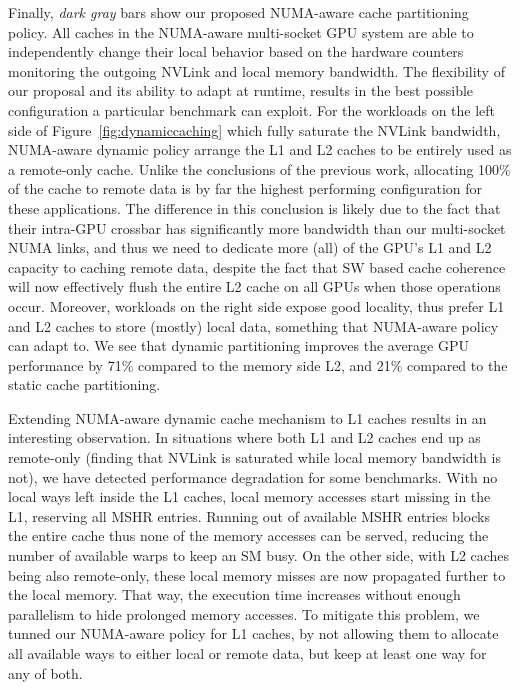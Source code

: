 Finally, \emph{dark gray} bars show our proposed NUMA-aware cache 
partitioning policy. All caches in the NUMA-aware multi-socket GPU system are 
able to independently change their local behavior based on the hardware 
counters monitoring the outgoing NVLink and local memory bandwidth. The 
flexibility of our proposal and its ability to adapt at runtime, results in 
the best possible configuration a particular benchmark can exploit. For the 
workloads on the left side of Figure~\ref{fig:dynamiccaching} which fully 
saturate the NVLink bandwidth, NUMA-aware dynamic policy arrange the L1 and 
L2 caches to be entirely used as a remote-only cache. Unlike the conclusions 
of the previous work, allocating 100\% of the cache to remote data is by far 
the highest performing configuration for these applications. The difference 
in this conclusion is likely due to the fact that their intra-GPU crossbar 
has significantly more bandwidth than our multi-socket NUMA links, and thus 
we need to dedicate more (all) of the GPU's L1 and L2 capacity to caching 
remote data, despite the fact that SW based cache coherence will now 
effectively flush the entire L2 cache on all GPUs when those operations 
occur. Moreover, workloads on the right side expose good locality, thus 
prefer L1 and L2 caches to store (mostly) local data, something that 
NUMA-aware policy can adapt to. We see that dynamic partitioning improves 
the average GPU performance by 71\% compared to the memory side L2, and 21\% 
compared to the static cache partitioning. 

Extending NUMA-aware dynamic cache mechanism to L1 caches results in an 
interesting observation. In situations where both L1 and L2 caches end up as 
remote-only (finding that NVLink is saturated while local memory bandwidth is 
not), we have detected performance degradation for some benchmarks. With no 
local ways left inside the L1 caches, local memory accesses start missing in 
the L1, reserving all MSHR entries. Running out of available MSHR entries 
blocks the entire cache thus none of the memory accesses can be served, 
reducing the number of available warps to keep an SM busy. On the other side, 
with L2 caches being also remote-only, these local memory misses are now 
propagated further to the local memory. That way, the execution time 
increases without enough parallelism to hide prolonged memory accesses. To 
mitigate this problem, we tunned our NUMA-aware policy for L1 caches, by not 
allowing them to allocate all available ways to either local or remote data, 
but keep at least one way for any of both. 

